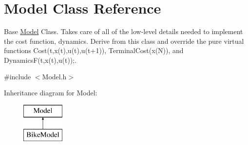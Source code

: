 \hypertarget{classModel}{}\section{Model Class Reference}
\label{classModel}


Base \mbox{\hyperlink{classModel}{Model}} Class. Takes care of all of the low-\/level details needed to implement the cost function, dynamics. Derive from this class and override the pure virtual functions Cost(t,x(t),u(t),u(t+1)), Terminal\+Cost(x(\+N)), and DynamicsF(t,x(t),u(t));.  




{\ttfamily \#include $<$Model.\+h$>$}

Inheritance diagram for Model\+:\begin{figure}[H]
\begin{center}
\leavevmode
\includegraphics[height=2.000000cm]{classModel}
\end{center}
\end{figure}
